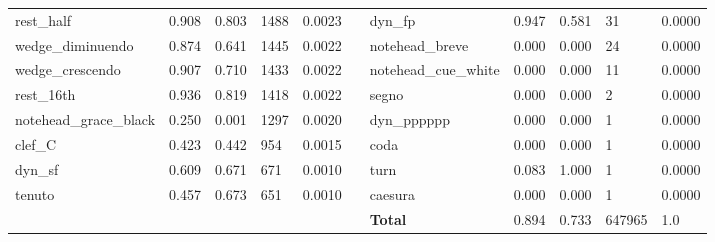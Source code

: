 \begin{table*}[ht]
\begin{adjustbox}{max width=\textwidth}
\begin{tabular}{@{}lllllllllll@{}}
rest\_half             & 0.908     & 0.803  & 1488   & 0.0023 &  & dyn\_fp                   & 0.947     & 0.581  & 31     & 0.0000 \\
wedge\_diminuendo      & 0.874     & 0.641  & 1445   & 0.0022 &  & notehead\_breve           & 0.000     & 0.000  & 24     & 0.0000 \\
wedge\_crescendo       & 0.907     & 0.710  & 1433   & 0.0022 &  & notehead\_cue\_white      & 0.000     & 0.000  & 11     & 0.0000 \\
rest\_16th             & 0.936     & 0.819  & 1418   & 0.0022 &  & segno                     & 0.000     & 0.000  & 2      & 0.0000 \\
notehead\_grace\_black & 0.250     & 0.001  & 1297   & 0.0020 &  & dyn\_pppppp               & 0.000     & 0.000  & 1      & 0.0000 \\
clef\_C                & 0.423     & 0.442  & 954    & 0.0015 &  & coda                      & 0.000     & 0.000  & 1      & 0.0000 \\
dyn\_sf                & 0.609     & 0.671  & 671    & 0.0010 &  & turn                      & 0.083     & 1.000  & 1      & 0.0000 \\
tenuto                 & 0.457     & 0.673  & 651    & 0.0010 &  & caesura                   & 0.000     & 0.000  & 1      & 0.0000 \\
                       &           &        &        &        &  & \textbf{Total}                     & 0.894     & 0.733  & 647965 & 1.0      \\ \cmidrule(r){1-5} \cmidrule(l){7-11} 
\end{tabular}
\end{adjustbox}
\end{table*}